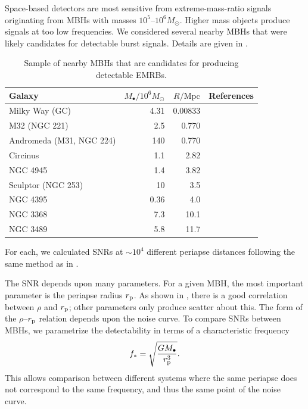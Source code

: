 Space-based detectors are most sensitive from extreme-mass-ratio signals originating from MBHs with masses $10^5$--$10^6 M_\odot$. Higher mass objects produce signals at too low frequencies. We considered several nearby MBHs that were likely candidates for detectable burst signals. Details are given in .
\begin{table}[htp]
 \centering
  \begin{tabular}{p{} D{.}{.}{3.2} D{.}{.}{2.5} p{0.45\textwidth}}
  \toprule
   Galaxy &  &  & References \\
 \midrule
 Milky Way (GC) & 4.31 & 0.00833& \citet{Gillessen2009} \\
 M32 (NGC 221) & 2.5 & 0.770 & \citet{Verolme2002,Karachentsev2004} \\
 Andromeda (M31, NGC 224) & 140 & 0.770 &  \citet{Bender2005,Karachentsev2004} \\
 Circinus & 1.1 & 2.82 & \citet{Graham2008,Greenhill2003,Karachentsev2007} \\
 NGC 4945 & 1.4 & 3.82	& \citet{Greenhill1997,Karachentsev2007} \\
 Sculptor (NGC 253) & 10 & 3.5 & \citet{Graham2011,Rodriguez-Rico2006,Rekola2005} \\
 NGC 4395 & 0.36 & 4.0& \citet{Peterson2005,Thim2004} \\
 NGC 3368 & 7.3 & 10.1 & \citet{Graham2011,Nowak2010,Tonry2001} \\
 NGC 3489 & 5.8 & 11.7 & \citet{Graham2011,Nowak2010,Tonry2001} \\
\bottomrule
\end{tabular}
\caption{Sample of nearby MBHs that are candidates for producing detectable EMRBs.\label{tab:MBHs}}
\end{table}
For each, we calculated SNRs at $\sim 10^4$ different periapse distances following the same method as in .

The SNR depends upon many parameters. For a given MBH, the most important parameter is the periapse radius $r_\mathrm{p}$. As shown in , there is a good correlation between $\rho$ and $r_\mathrm{p}$; other parameters only produce scatter about this. The form of the $\rho$--$r_\mathrm{p}$ relation depends upon the noise curve. To compare SNRs between MBHs, we parametrize the detectability in terms of a characteristic frequency
\begin{equation}
f_\ast = \sqrt{\frac{GM_\bullet}{r_\mathrm{p}^3}}.
\end{equation}
This allows comparison between different systems where the same periapse does not correspond to the same frequency, and thus the same point of the noise curve.

